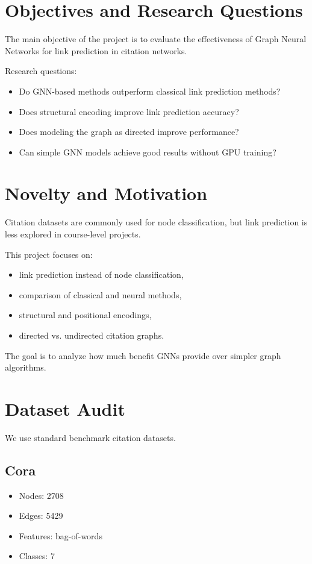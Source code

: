 \documentclass[11pt,a4paper]{article}
\begin{document}
\section{Objectives and Research Questions}

The main objective of the project is to evaluate the effectiveness
of Graph Neural Networks for link prediction in citation networks.

Research questions:
\begin{itemize}
\item Do GNN-based methods outperform classical link prediction methods?
\item Does structural encoding improve link prediction accuracy?
\item Does modeling the graph as directed improve performance?
\item Can simple GNN models achieve good results without GPU training?
\end{itemize}

\section{Novelty and Motivation}

Citation datasets are commonly used for node classification,
but link prediction is less explored in course-level projects.

This project focuses on:
\begin{itemize}
\item link prediction instead of node classification,
\item comparison of classical and neural methods,
\item structural and positional encodings,
\item directed vs. undirected citation graphs.
\end{itemize}

The goal is to analyze how much benefit GNNs provide
over simpler graph algorithms.

\section{Dataset Audit}

We use standard benchmark citation datasets.

\subsection{Cora}
\begin{itemize}
\item Nodes: 2708
\item Edges: 5429
\item Features: bag-of-words
\item Classes: 7
\end{itemize}
\end{document}
